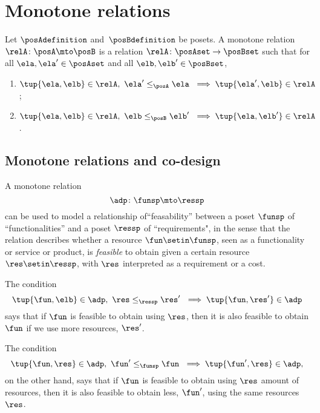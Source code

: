 \section{Monotone relations}



\begin{definition}
Let $\posAdefinition$ and~$\posBdefinition$ be posets. A monotone relation $\relA \colon \posA \mto \posB$ is a relation $\relA \colon \posAset \to \posBset$ such that for all $\ela, \ela' \in \posAset$ and all $\elb, \elb' \in \posBset$, 
\begin{enumerate}
\item $\tup{\ela, \elb} \in \relA, \ \ela' \leq_{\posA} \ela \ \implies \tup{\ela', \elb} \in \relA$;
\item $\tup{\ela, \elb} \in \relA, \ \elb \leq_{\posB} \elb' \ \implies \tup{\ela, \elb'} \in \relA$.
\end{enumerate}
\end{definition}

\subsection{Monotone relations and co-design}

A monotone relation
\begin{equation}
\adp \colon \funsp \mto \ressp
\end{equation}
can be used to model a relationship of``feasability'' between a poset $\funsp$ of ``functionalities'' and a poset $\ressp$ of ``requirements", in the sense that the relation describes whether a resource $\fun \setin \funsp$, seen as a functionality or service or product, is \emph{feasible} to obtain given a certain resource $\res \setin \ressp$, with $\res$ interpreted as a requirement or a cost.

The condition
\begin{equation}
\tup{\fun, \elb} \in \adp, \ \res \leq_{\ressp} \res' \ \implies \tup{\fun, \res'} \in \adp
\end{equation}
says that if $\fun$ is feasible to obtain using $\res$, then it is also feasible to obtain $\fun$ if we use more resources, $\res'$. 

The condition
\begin{equation}
\tup{\fun, \res} \in \adp, \ \fun' \leq_{\funsp} \fun \ \implies \tup{\fun', \res} \in \adp,
\end{equation}
on the other hand, says that if $\fun$ is feasible to obtain using $\res$ amount of resources, then it is also feasible to obtain less, $\fun'$, using the same resources $\res$. 